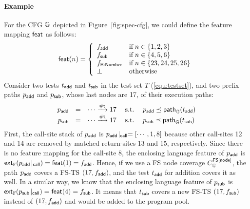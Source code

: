 \paragraph{\textbf{Example}}
%
For the CFG $\mathbb{G}$ depicted in Figure~\ref{fig:spec-cfg}, we could define the
feature mapping $\textsf{feat}$ as follows:
\begin{equation}\label{equ:featmap}
  \textsf{feat}(n) = \left\{
    \begin{array}{ll}
      f_{\textsf{add}} & \text{if} \; n \in \{ 1, 2, 3\} \\
      f_{\textsf{sub}} & \text{if} \; n \in \{ 4, 5, 6\} \\
      f_{\textsf{B:Number}} & \text{if} \; n \in \{ 23, 24, 25, 26 \} \\
      \bot & \text{otherwise}
    \end{array}
  \right.
\end{equation}
%
Consider two tests $t_{\textsf{add}}$ and $t_{\textsf{sub}}$ in the test set $T$
(\ref{equ:testset}), and two prefix paths $p_{\textsf{add}}$ and $p_{\textsf{sub}}$, whose last
nodes are 17, of their execution paths:
%
\begin{equation}\label{equ:prepath}
  \begin{array}{rclcl}
    p_{\textsf{add}} &=& \cdots \xrightarrow{\textsf{\#t}} 17 &{\; \text{s.t.} \; }&
    p_{\textsf{add}} \preceq \textsf{path}_{\mathbb{G}}(t_{\textsf{add}})\\

    p_{\textsf{sub}} &=& \cdots \xrightarrow{\textsf{\#t}} 17 &{\; \text{s.t.} \; }&
    p_{\textsf{sub}} \preceq \textsf{path}_{\mathbb{G}}(t_{\textsf{sub}})\\
  \end{array}
\end{equation}
%
First, the call-site stack of $p_{\textsf{add}}$ is ${p_{\textsf{add}}}\!\mid_{\textsf{call}} = [\cdots, 1, 8]$
because other call-sites 12 and 14 are removed by matched return-sites 13 and
15, respectively.
%
Since there is no feature mapping for the call-site 8, the enclosing language
feature of $p_{\textsf{add}}$ is $\textsf{ext}_{\mathbb{F}}({p_{\textsf{add}}}\!\mid_{\textsf{call}}) = \textsf{feat}(1) = f_{\textsf{add}}$.
%
Hence, if we use a FS node coverage $C_{\mathbb{G}}^{\textsf{FS}[\textsf{node}]}$, the path $p_{\textsf{add}}$
covers a FS-TS $(17, f_{\textsf{add}})$, and the test $t_{\textsf{add}}$ for addition covers it
as well.
%
In a similar way, we know that the enclosing language feature of $p_{\textsf{sub}}$
is $\textsf{ext}_{\mathbb{F}}({p_{\textsf{sub}}}\!\mid_{\textsf{call}}) = \textsf{feat}(4) = f_{\textsf{sub}}$.
%
It means that $t_{\textsf{sub}}$ covers a new FS-TS $(17, f_{\textsf{sub}})$ instead of $(17,
f_{\textsf{add}})$ and would be added to the program pool.


